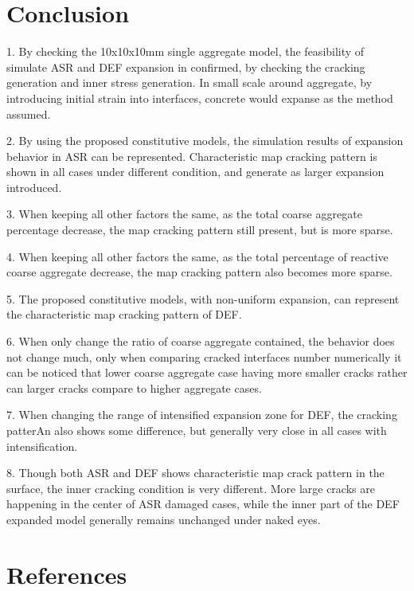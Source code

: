 \clearpage
\section{Conclusion}

1. By checking the 10x10x10mm single aggregate model, the feasibility of simulate ASR and DEF expansion in confirmed, by checking the cracking generation and inner stress generation. In small scale around aggregate, by introducing initial strain into interfaces, concrete would expanse as the method assumed.

2. By using the proposed constitutive models, the simulation results of expansion behavior in ASR can be represented. Characteristic map cracking pattern is shown in all cases under different condition, and generate as larger expansion introduced.

3. When keeping all other factors the same, as the total coarse aggregate percentage decrease, the map cracking pattern still present, but is more sparse.

4. When keeping all other factors the same, as the total percentage of reactive coarse aggregate decrease, the map cracking pattern also becomes more sparse.

5. The proposed constitutive models, with non-uniform expansion, can represent the characteristic map cracking pattern of DEF.

6. When only change the ratio of coarse aggregate contained, the behavior does not change much, only when comparing cracked interfaces number numerically it can be noticed that lower coarse aggregate case having more smaller cracks rather can larger cracks compare to higher aggregate cases.

7. When changing the range of intensified expansion zone for DEF, the cracking patterAn also shows some difference, but generally very close in all cases with intensification.

8. Though both ASR and DEF shows characteristic map crack pattern in the surface, the inner cracking condition is very different. More large cracks are happening in the center of ASR damaged cases, while the inner part of the DEF expanded model generally remains unchanged under naked eyes.

\section{References}
 
